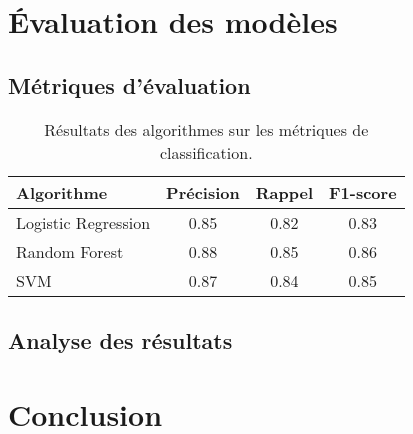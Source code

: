 \documentclass[11pt]{article}
\begin{document}
\section{Évaluation des modèles}

\subsection{Métriques d'évaluation}
\begin{table}[ht]
    \centering
    \begin{tabular}{lccc}
        \toprule
        \textbf{Algorithme} & \textbf{Précision} & \textbf{Rappel} & \textbf{F1-score} \\ \midrule
        Logistic Regression & 0.85               & 0.82            & 0.83              \\
        Random Forest       & 0.88               & 0.85            & 0.86              \\
        SVM                 & 0.87               & 0.84            & 0.85              \\ \bottomrule
    \end{tabular}
    \caption{Résultats des algorithmes sur les métriques de classification.}
    \label{tab:resultats_algo}
\end{table}

\subsection{Analyse des résultats}


\section{Conclusion}



\cite{forest2009variation}
\end{document}
